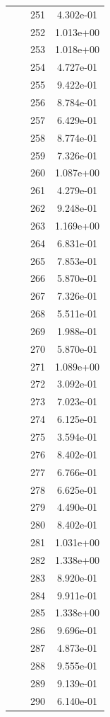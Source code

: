 \documentclass[12pt]{article}
\begin{document}
\begin{longtable}{@{}cccc@{}}
 &  & 251 & 4.302e-01 \\
 &  & 252 & 1.013e+00 \\
 &  & 253 & 1.018e+00 \\
 &  & 254 & 4.727e-01 \\
 &  & 255 & 9.422e-01 \\
 &  & 256 & 8.784e-01 \\
 &  & 257 & 6.429e-01 \\
 &  & 258 & 8.774e-01 \\
 &  & 259 & 7.326e-01 \\
 &  & 260 & 1.087e+00 \\
 &  & 261 & 4.279e-01 \\
 &  & 262 & 9.248e-01 \\
 &  & 263 & 1.169e+00 \\
 &  & 264 & 6.831e-01 \\
 &  & 265 & 7.853e-01 \\
 &  & 266 & 5.870e-01 \\
 &  & 267 & 7.326e-01 \\
 &  & 268 & 5.511e-01 \\
 &  & 269 & 1.988e-01 \\
 &  & 270 & 5.870e-01 \\
 &  & 271 & 1.089e+00 \\
 &  & 272 & 3.092e-01 \\
 &  & 273 & 7.023e-01 \\
 &  & 274 & 6.125e-01 \\
 &  & 275 & 3.594e-01 \\
 &  & 276 & 8.402e-01 \\
 &  & 277 & 6.766e-01 \\
 &  & 278 & 6.625e-01 \\
 &  & 279 & 4.490e-01 \\
 &  & 280 & 8.402e-01 \\
 &  & 281 & 1.031e+00 \\
 &  & 282 & 1.338e+00 \\
 &  & 283 & 8.920e-01 \\
 &  & 284 & 9.911e-01 \\
 &  & 285 & 1.338e+00 \\
 &  & 286 & 9.696e-01 \\
 &  & 287 & 4.873e-01 \\
 &  & 288 & 9.555e-01 \\
 &  & 289 & 9.139e-01 \\
 &  & 290 & 6.140e-01 \\

\end{longtable}
\end{document}
